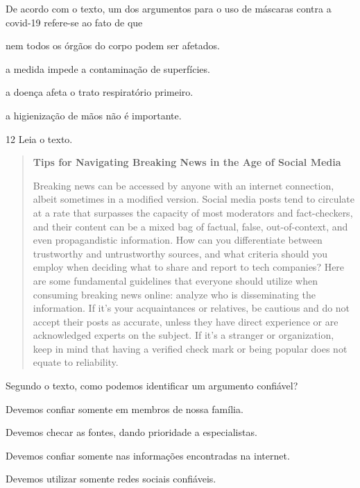 \pagebreak
De acordo com o texto, um dos argumentos para o uso de máscaras contra a
covid-19 refere-se ao fato de que

\begin{escolha}
\item nem todos os órgãos do corpo podem ser afetados.

\item a medida impede a contaminação de superfícies.

\item a doença afeta o trato respiratório primeiro.

\item a higienização de mãos não é importante.
\end{escolha}

\num{12} Leia o texto.

\begin{quote}
\textbf{Tips for Navigating Breaking News in the Age of Social Media}

Breaking news can be accessed by anyone with an internet connection,
albeit sometimes in a modified version. Social media posts tend to
circulate at a rate that surpasses the capacity of most moderators and
fact-checkers, and their content can be a mixed bag of factual, false,
out-of-context, and even propagandistic information. How can you
differentiate between trustworthy and untrustworthy sources, and what
criteria should you employ when deciding what to share and report to
tech companies? Here are some fundamental guidelines that everyone
should utilize when consuming breaking news online: analyze who is
disseminating the information. If it's your acquaintances or relatives,
be cautious and do not accept their posts as accurate, unless they have
direct experience or are acknowledged experts on the subject. If it's a
stranger or organization, keep in mind that having a verified check mark
or being popular does not equate to reliability.

\end{quote}

Segundo o texto, como podemos identificar um argumento confiável?

\begin{escolha}
\item Devemos confiar somente em membros de nossa família.

\item Devemos checar as fontes, dando prioridade a especialistas.

\item Devemos confiar somente nas informações encontradas na internet.

\item Devemos utilizar somente redes sociais confiáveis.
\end{escolha}

